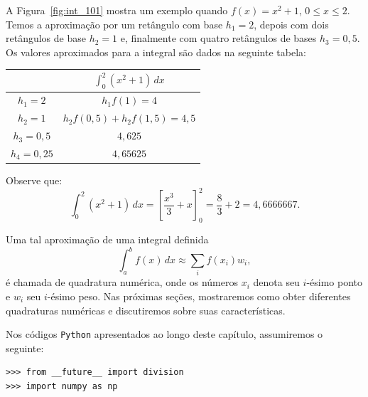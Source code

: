 \begin{ex}
A Figura~\ref{fig:int_101} mostra um exemplo quando $f(x)=x^2+1$, $0\leq x\leq 2$. Temos a aproximação por um retângulo com base $h_1=2$, depois com dois retângulos de base $h_2=1$ e, finalmente com quatro retângulos de bases $h_3=0,5$. Os valores aproximados para a integral são dados na seguinte tabela:
\begin{center}
  \begin{tabular}{|c|c|}\hline
    & $\displaystyle \int_0^2(x^2+1)\,dx$ \\ \hline
    $h_1=2$ & $h_1f(1)=4$ \\
    $h_2=1$ & $h_2f(0,5)+h_2f(1,5)=4,5$ \\
    $h_3=0,5$ & $4,625$ \\
    $h_4=0,25$ & $4,65625$ \\\hline
  \end{tabular}
\end{center}
Observe que:
\begin{equation}
  \int_0^2(x^2+1)\,dx = \left[\frac{x^3}{3}+x\right]_0^2 = \frac{8}{3}+2=4,6666667.
\end{equation}
\end{ex}


Uma tal aproximação de uma integral definida
\begin{equation}
  \int_a^b f(x)\,dx \approx \sum_{i} f(x_i)w_i,
\end{equation}
é chamada de quadratura numérica, onde os números $x_i$ denota seu $i$-ésimo ponto e $w_i$ seu $i$-ésimo peso. Nas próximas seções, mostraremos como obter diferentes quadraturas numéricas e discutiremos sobre suas características.



\ifispython
Nos códigos \verb+Python+ apresentados ao longo deste capítulo, assumiremos o seguinte:
\begin{verbatim}
>>> from __future__ import division
>>> import numpy as np
\end{verbatim}
\fi

